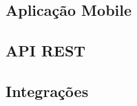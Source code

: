 
\subsection{Aplicação Mobile}\label{subsec:app}

\subsection{API REST}\label{subsec:apirest}

\subsection{Integrações}\label{subsec:integrar}
